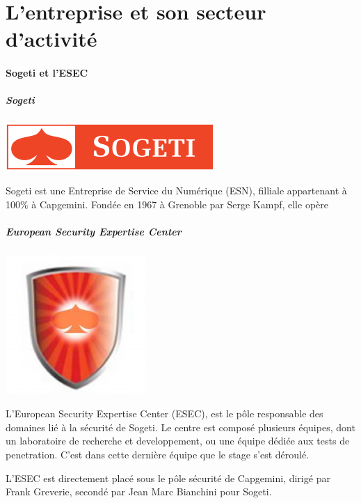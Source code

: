 \section*{L'entreprise et son secteur d'activité}
\paragraph{Sogeti et l'ESEC}
\subparagraph{Sogeti}
\begin{center}
\includegraphics[scale=0.7]{sogeti.png}
\end{center}
Sogeti est une Entreprise de Service du Numérique (ESN), filliale appartenant
à 100\% à Capgemini. Fondée en 1967 à Grenoble par Serge Kampf, elle opère
\paragraph{}
\paragraph{}

\subparagraph{European Security Expertise Center}
\begin{center}
\includegraphics[scale=0.4]{esec.png}
\end{center}
L'European Security Expertise Center (ESEC), est le pôle responsable des domaines
lié à la sécurité de Sogeti. Le centre est composé plusieurs équipes, dont un
laboratoire de recherche et developpement, ou une équipe dédiée aux tests de penetration.
C'est dans cette dernière équipe que le stage s'est déroulé.

L'ESEC est directement placé sous le pôle sécurité de Capgemini, dirigé par Frank
Greverie, secondé par Jean Marc Bianchini pour Sogeti.

